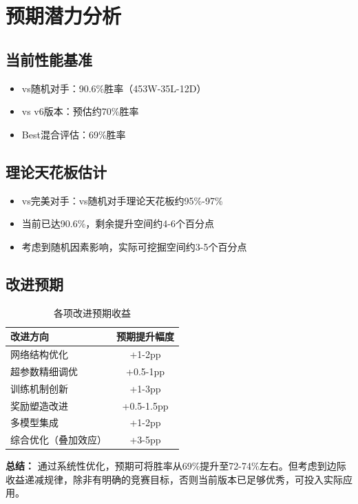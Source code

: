 \documentclass[12pt,a4paper]{article}
\begin{document}
\newpage

\section{预期潜力分析}

\subsection{当前性能基准}
\begin{itemize}
\item vs随机对手：90.6\%胜率（453W-35L-12D）
\item vs v6版本：预估约70\%胜率
\item Best混合评估：69\%胜率
\end{itemize}

\subsection{理论天花板估计}
\begin{itemize}
\item vs完美对手：vs随机对手理论天花板约95\%-97\%
\item 当前已达90.6\%，剩余提升空间约4-6个百分点
\item 考虑到随机因素影响，实际可挖掘空间约3-5个百分点
\end{itemize}

\subsection{改进预期}
\begin{table}[H]
\centering
\caption{各项改进预期收益}
\begin{tabular}{lc}
\toprule
\textbf{改进方向} & \textbf{预期提升幅度} \\
\midrule
网络结构优化 & +1-2pp \\
超参数精细调优 & +0.5-1pp \\
训练机制创新 & +1-3pp \\
奖励塑造改进 & +0.5-1.5pp \\
多模型集成 & +1-2pp \\
\midrule
综合优化（叠加效应） & +3-5pp \\
\bottomrule
\end{tabular}
\end{table}

\textcolor{primary}{\textbf{总结：}} 通过系统性优化，预期可将胜率从69\%提升至72-74\%左右。但考虑到边际收益递减规律，除非有明确的竞赛目标，否则当前版本已足够优秀，可投入实际应用。
\end{document}
